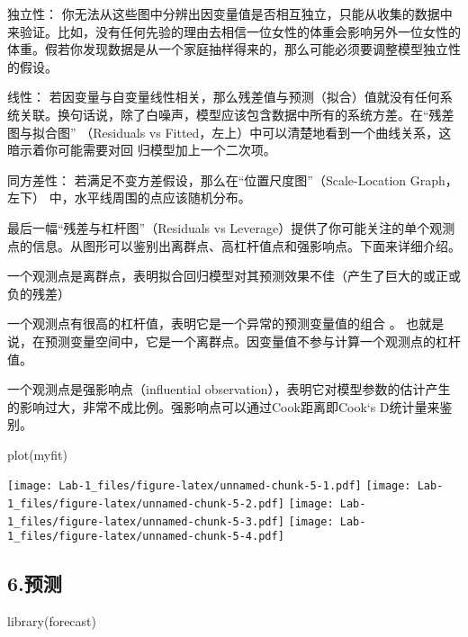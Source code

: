 \documentclass[
]{article}
\newenvironment{Shaded}{\begin{snugshade}}{\end{snugshade}}
\newcommand{\FunctionTok}[1]{\textcolor[rgb]{0.00,0.00,0.00}{#1}}
\newcommand{\NormalTok}[1]{#1}
\begin{document}
独立性：
你无法从这些图中分辨出因变量值是否相互独立，只能从收集的数据中来验证。比如，没有任何先验的理由去相信一位女性的体重会影响另外一位女性的体重。假若你发现数据是从一个家庭抽样得来的，那么可能必须要调整模型独立性的假设。

线性：
若因变量与自变量线性相关，那么残差值与预测（拟合）值就没有任何系统关联。换句话说，除了白噪声，模型应该包含数据中所有的系统方差。在``残差图与拟合图''
（Residuals vs
Fitted，左上）中可以清楚地看到一个曲线关系，这暗示着你可能需要对回
归模型加上一个二次项。

同方差性： 若满足不变方差假设，那么在``位置尺度图''（Scale-Location
Graph，左下） 中，水平线周围的点应该随机分布。

最后一幅``残差与杠杆图''（Residuals vs
Leverage）提供了你可能关注的单个观测点的信息。从图形可以鉴别出离群点、高杠杆值点和强影响点。下面来详细介绍。

一个观测点是离群点，表明拟合回归模型对其预测效果不佳（产生了巨大的或正或负的残差）

一个观测点有很高的杠杆值，表明它是一个异常的预测变量值的组合 。
也就是说，在预测变量空间中，它是一个离群点。因变量值不参与计算一个观测点的杠杆值。

一个观测点是强影响点（influential
observation），表明它对模型参数的估计产生的影响过大，非常不成比例。强影响点可以通过Cook距离即Cook`s
D统计量来鉴别。

\begin{Shaded}
\begin{Highlighting}[]
\FunctionTok{plot}\NormalTok{(myfit)}
\end{Highlighting}
\end{Shaded}

\texttt{[image: Lab-1\_files/figure-latex/unnamed-chunk-5-1.pdf]}
\texttt{[image: Lab-1\_files/figure-latex/unnamed-chunk-5-2.pdf]}
\texttt{[image: Lab-1\_files/figure-latex/unnamed-chunk-5-3.pdf]}
\texttt{[image: Lab-1\_files/figure-latex/unnamed-chunk-5-4.pdf]}

\hypertarget{ux9884ux6d4b}{%
\subsection{6.预测}\label{ux9884ux6d4b}}

\begin{Shaded}
\begin{Highlighting}[]
\FunctionTok{library}\NormalTok{(forecast)}
\end{Highlighting}
\end{Shaded}
\end{document}
